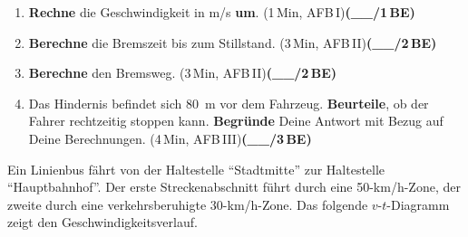 \documentclass[11pt,a4paper]{article}
\newcommand{\BEZEIT}[3]{%
\hfill{\small\color{zeitgray}(#1\,Min, AFB\,#2)}\quad\textbf{(\_\_/#3\,BE)}%
}
\begin{document}
\vspace{0.3cm}

\begin{enumerate}
\item[a)] \textbf{Rechne} die Geschwindigkeit in m/s \textbf{um}. \BEZEIT{1}{I}{1}

\vspace{2cm}

\item[b)] \textbf{Berechne} die Bremszeit bis zum Stillstand. \BEZEIT{3}{II}{2}

\vspace{4cm}

\item[c)] \textbf{Berechne} den Bremsweg. \BEZEIT{3}{II}{2}

\vspace{4cm}

\item[d)] Das Hindernis befindet sich \SI{80}{\metre} vor dem Fahrzeug. \textbf{Beurteile}, ob der Fahrer rechtzeitig stoppen kann. \textbf{Begründe} Deine Antwort mit Bezug auf Deine Berechnungen. \BEZEIT{4}{III}{3}

\vspace{4cm}

\end{enumerate}

\newpage


\noindent{}

\vspace{0.4cm}

Ein Linienbus fährt von der Haltestelle "`Stadtmitte"' zur Haltestelle "`Hauptbahnhof"'. Der erste Streckenabschnitt führt durch eine 50-km/h-Zone, der zweite durch eine verkehrsberuhigte 30-km/h-Zone. Das folgende $v$-$t$-Diagramm zeigt den Geschwindigkeitsverlauf.

\vspace{0.3cm}
\end{document}
